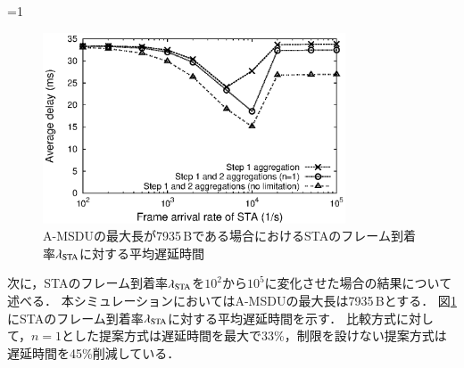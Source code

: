\documentclass[master]{kuisthesis}		%
\newcounter{flagFig}
\begin{document}
			\ifnum\value{flagFig}=1 {\begin{figure}[t]
				\begin{center}
					\includegraphics[width=0.8\textwidth]{graph/dly_lmd.eps}
					\caption{A-MSDUの最大長が7935\,Bである場合におけるSTAのフレーム到着率$\lambda_{\rm STA}$に対する平均遅延時間}
					\label{fig:dly_lmd}
				\end{center}
			\end{figure}}\fi
			次に，STAのフレーム到着率$\lambda_{\rm STA}$を$10^2$から$10^5$に変化させた場合の結果について述べる．
			本シミュレーションにおいてはA-MSDUの最大長は7935\,Bとする．
			図\ref{fig:dly_lmd}にSTAのフレーム到着率$\lambda_{\rm STA}$に対する平均遅延時間を示す．
			比較方式に対して，$n=1$とした提案方式は遅延時間を最大で33\%，制限を設けない提案方式は遅延時間を45\%削減している．
\end{document}
